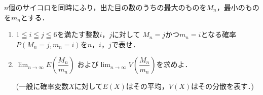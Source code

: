 \documentclass[../../main.tex]{subfiles}
\begin{document}
$n$個のサイコロを同時にふり，出た目の数のうちの最大のものを$M_n$，最小のものを$m_n$とする．
\begin{enumerate}
  \item $1 \leqq i \leqq j \leqq 6$を満たす整数$i$，$j$に対して
    $M_n=j$かつ$m_n=i$となる確率$P(M_n=j,m_n=i)$を$n$，$i$，$j$で表せ．
  \item $\displaystyle\lim_{n\to\infty}E\left(\dfrac{M_n}{m_n}\right)$
    および$\displaystyle\lim_{n\to\infty}V\left(\dfrac{M_n}{m_n}\right)$を求めよ．

    (一般に確率変数$X$に対して$E(X)$はその平均，$V(X)$はその分散を表す．)
\end{enumerate}
\end{document}
